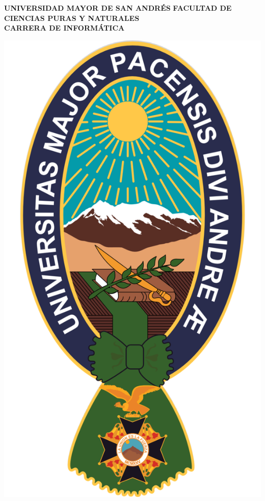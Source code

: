 \begin{titlepage} %
	\begin{center}
	    {\fontsize{20}{20}\selectfont \textbf{UNIVERSIDAD MAYOR DE SAN ANDRÉS}}
		{\fontsize{16}{16}\selectfont \textbf{FACULTAD DE CIENCIAS PURAS Y NATURALES\\
		CARRERA DE INFORMÁTICA}}
		
		\includegraphics[scale=0.20]{images/logo_umsa.png}
		

\end{center}
\end{titlepage}

